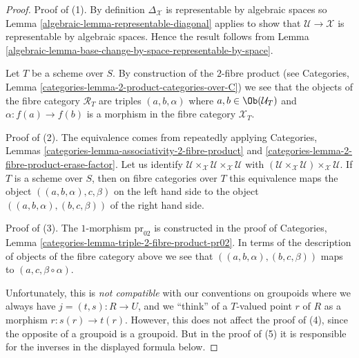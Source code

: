 \begin{proof}

Proof of (1). By definition $\Delta_\mathcal{X}$ is representable
by algebraic spaces so
Lemma \ref{algebraic-lemma-representable-diagonal}
applies to show that $\mathcal{U} \to \mathcal{X}$ is representable
by algebraic spaces. Hence the result follows from
Lemma \ref{algebraic-lemma-base-change-by-space-representable-by-space}.

\medskip\noindent
Let $T$ be a scheme over $S$. By construction of the $2$-fibre product (see
Categories, Lemma \ref{categories-lemma-2-product-categories-over-C})
we see that the objects of the fibre category $\mathcal{R}_T$
are triples $(a, b, \alpha)$ where $a, b \in \Ob(\mathcal{U}_T)$
and $\alpha : f(a) \to f(b)$
is a morphism in the fibre category $\mathcal{X}_T$.

\medskip\noindent
Proof of (2). The equivalence comes from repeatedly applying
Categories, Lemmas \ref{categories-lemma-associativity-2-fibre-product} and
\ref{categories-lemma-2-fibre-product-erase-factor}.
Let us identify
$\mathcal{U} \times_\mathcal{X} \mathcal{U} \times_\mathcal{X} \mathcal{U}$
with
$(\mathcal{U} \times_\mathcal{X} \mathcal{U})
\times_\mathcal{X} \mathcal{U}$.
If $T$ is a scheme over $S$, then on fibre categories over $T$
this equivalence maps the object
$((a, b, \alpha), c, \beta)$ on the left hand side
to the object $((a, b, \alpha), (b, c, \beta))$ of the right hand side.

\medskip\noindent
Proof of (3). The $1$-morphism $\text{pr}_{02}$ is constructed in the proof of
Categories, Lemma \ref{categories-lemma-triple-2-fibre-product-pr02}.
In terms of the description of objects of the fibre category
above we see that $((a, b, \alpha), (b, c, \beta))$
maps to $(a, c, \beta \circ \alpha)$.

\medskip\noindent
Unfortunately, this is {\it not compatible} with our conventions on
groupoids where we always have $j = (t, s) : R \to U$, and we ``think''
of a $T$-valued point $r$ of $R$ as a morphism $r : s(r) \to t(r)$.
However, this does not affect the proof of (4), since the opposite of
a groupoid is a groupoid. But in the proof of (5) it is responsible
for the inverses in the displayed formula below.


\end{proof}

